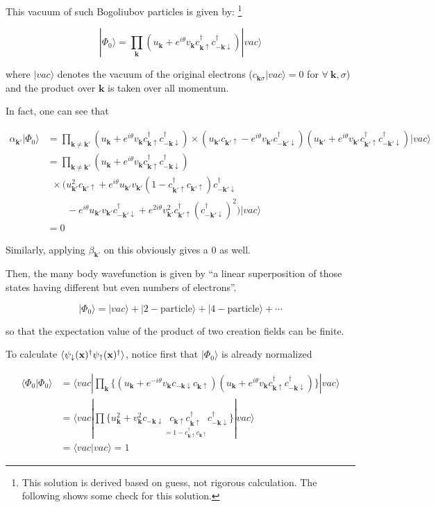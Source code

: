 This vacuum of such Bogoliubov particles is given by: \footnote{This solution is derived based on guess, not rigorous calculation. The following shows some check for this solution. }

\[|\Phi_0\rangle = \prod_{\bm{k}}(u_{\bm{k}}+e^{i\theta}v_{\bm{k}}c_{\bm{k}\uparrow}^\dagger c_{-\bm{k}\downarrow}^\dagger)|vac\rangle \]

where $|vac\rangle$ denotes the vacuum of the original electrons ($c_{\bm{k}\sigma}|vac\rangle = 0$ for $\forall\ \bm{k},\sigma$) and the product over $\bm{k}$ is taken over all momentum. 

In fact, one can see that 

\[
\begin{split}
\alpha_{\bm{k}'}|\Phi_0\rangle &= \prod_{\bm{k} \neq \bm{k}'} (u_{\bm{k}}+e^{i\theta}v_{\bm{k}}c_{\bm{k}\uparrow}^\dagger c_{-\bm{k}\downarrow}^\dagger)\times( u_{\bm{k}'}c_{\bm{k}'\uparrow} - e^{i\theta}v_{\bm{k}'}c_{-\bm{k}'\downarrow}^\dagger)(u_{\bm{k}'}+e^{i\theta}v_{\bm{k}'}c_{\bm{k}'\uparrow}^\dagger c_{-\bm{k}'\downarrow}^\dagger)|vac\rangle \\
&=\prod_{\bm{k}\neq\bm{k}'}(u_{\bm{k}}+e^{i\theta}v_{\bm{k}}c_{\bm{k}\uparrow}^\dagger c_{-\bm{k}\downarrow}^\dagger)\\
&\ \ \times (u_{\bm{k}'}^2c_{\bm{k}'\uparrow}+e^{i\theta}u_{\bm{k}'}v_{\bm{k}'}(1-c_{\bm{k}'\uparrow}^\dagger c_{\bm{k}'\uparrow})c_{-\bm{k}'\downarrow}^\dagger\\
&\quad\quad -e^{i\theta}u_{\bm{k}'}v_{\bm{k}'}c_{-\bm{k}'\downarrow}^\dagger + e^{2i\theta}v_{\bm{k}'}^2c_{\bm{k}'\uparrow}^\dagger(c_{-\bm{k}'\downarrow}^\dagger)^2)|vac\rangle\\
&=0
\end{split}\]

Similarly, applying $\beta_{\bm{k}'}$ on this obviously gives a $0$ as well. 

Then, the many body wavefunction is given by ``a linear superposition of those states having different but even numbers of electrons''. 

\[|\Phi_0\rangle = |vac\rangle + |2-\text{particle}\rangle + |4-\text{particle}\rangle+\cdots \]

so that the expectation value of the product of two creation fields can be finite. 

To calculate $\langle\psi_{\downarrow}(\bf{x})^\dagger\psi_{\uparrow}(\bf{x})^\dagger\rangle$, notice first that $|\Phi_0\rangle$ is already normalized

\[\begin{split}
\langle\Phi_0|\Phi_0\rangle &= \langle vac| \prod_{\bm{k}}\{(u_{\bm{k}}+e^{-i\theta}v_{\bm{k}}c_{-\bm{k}\downarrow}c_{\bm{k}\uparrow})(u_{\bm{k}}+e^{i\theta}v_{\bm{k}}c_{\bm{k}\uparrow}^\dagger c_{-\bm{k}\downarrow}^\dagger)\}|vac\rangle\\
&= \langle vac|\prod\{u_{\bm{k}}^2+v_{\bm{k}}^2c_{-\bm{k}\downarrow}\underset{=1-c_{\bm{k}\uparrow}^\dagger c_{\bm{k}\uparrow}}{c_{\bm{k}\uparrow}c_{\bm{k}\uparrow}^\dagger} c_{-\bm{k}\downarrow}^\dagger\}|vac\rangle\\
&=\langle vac|vac\rangle = 1
\end{split}\]

